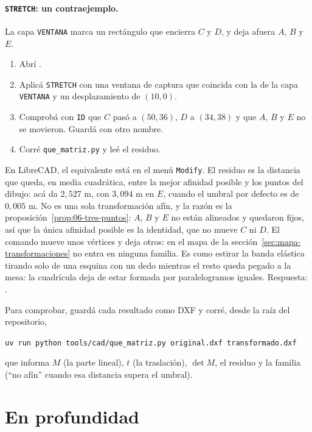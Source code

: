 \paragraph{\texttt{STRETCH}: un contraejemplo.} La capa \texttt{VENTANA} marca un rectángulo
que encierra \(C\) y \(D\), y deja afuera \(A\), \(B\) y \(E\).
\begin{enumerate}
  \item Abrí .
  \item Aplicá \texttt{STRETCH} con una ventana de captura que coincida con la de la capa
  \texttt{VENTANA} y un desplazamiento de \((10,0)\).
  \item Comprobá con \texttt{ID} que \(C\) pasó a \((50,36)\), \(D\) a \((34,38)\) y que \(A\),
  \(B\) y \(E\) no se movieron. Guardá con otro nombre.
  \item Corré \texttt{que\_matriz.py} y leé el residuo.
\end{enumerate}
En LibreCAD, el equivalente está en el menú \texttt{Modify}. El residuo es la distancia que
queda, en media cuadrática, entre la mejor afinidad posible y los puntos del dibujo: acá da
\(2{,}527\) m, con \(3{,}094\) m en \(E\), cuando el umbral por defecto es de
\(0{,}005\) m. No es una sola transformación afín, y la razón es la
proposición~\ref{prop:06-tres-puntos}: \(A\), \(B\) y \(E\) no están alineados y quedaron
fijos, así que la única afinidad posible es la identidad, que no mueve \(C\) ni \(D\). El
comando mueve unos vértices y deja otros: en el mapa de la sección~\ref{sec:mapa-transformaciones}
no entra en ninguna familia. Es como estirar la banda elástica tirando solo de una esquina con
un dedo mientras el resto queda pegado a la mesa: la cuadrícula deja de estar formada por
paralelogramos iguales. Respuesta: .

Para comprobar, guardá cada resultado como DXF y corré, desde la raíz del repositorio,
\begin{center}\small
\texttt{uv run python tools/cad/que\_matriz.py original.dxf transformado.dxf}
\end{center}
que informa \(M\) (la parte lineal), \(t\) (la traslación), \(\det M\), el residuo y la familia (\enquote{no afín} cuando esa
distancia supera el umbral).

\section{En profundidad}

